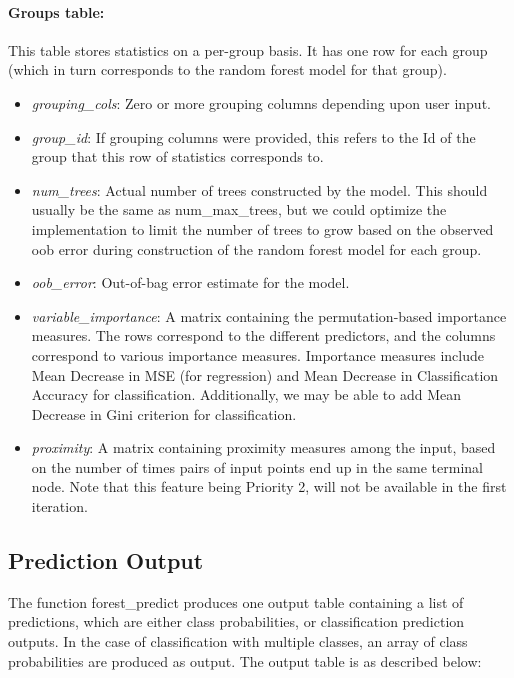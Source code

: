 \paragraph{Groups table:}
This table stores statistics on a per-group basis. It has one row for each group (which in turn
corresponds to the random forest model for that group).
\begin{itemize}
    \item \emph{grouping\_cols}: Zero or more grouping columns depending upon user input.
    \item \emph{group\_id}: If grouping columns were provided, this refers to the Id of the group
    that this row of statistics corresponds to.
    \item \emph{num\_trees}: Actual number of trees constructed by the model. This should usually be the same
    as num\_max\_trees, but we could optimize the implementation to limit the number of trees to grow
    based on the observed oob error during construction of the random forest model for each group.
    \item \emph{oob\_error}: Out-of-bag error estimate for the model.
    \item \emph{variable\_importance}: A matrix containing the permutation-based importance measures.
    The rows correspond to the different predictors, and the columns correspond to various importance measures.
    Importance measures include Mean Decrease in MSE (for regression) and Mean Decrease in Classification
    Accuracy for classification. Additionally, we may be able to add Mean Decrease in Gini criterion for classification.
    \item \emph{proximity}: A matrix containing proximity measures among the input, based
    on the number of times pairs of input points end up in the same terminal node. Note that this
    feature being Priority 2, will not be available in the first iteration.
\end{itemize}

\subsection{Prediction Output}
\label{sub:prediction_out}
The function forest\_predict produces one output table containing a list of predictions, which 
are either class probabilities, or classification prediction outputs. In the case of 
classification with multiple classes, an array of class probabilities are produced as output.
The output table is as described below:

